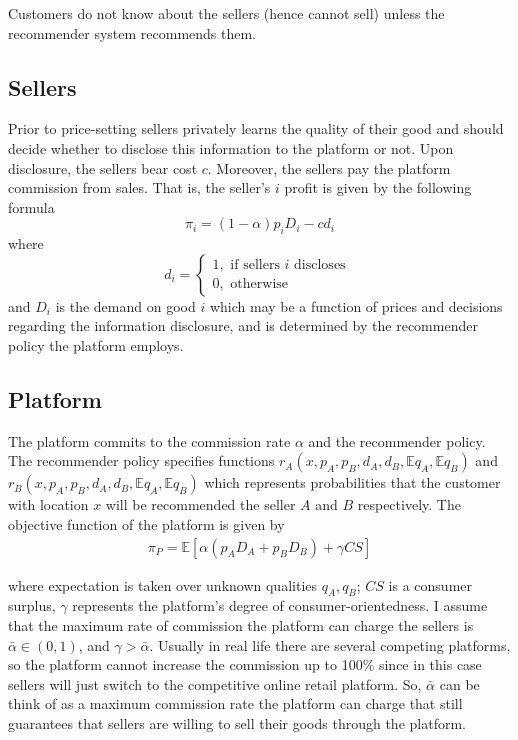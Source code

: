 \documentclass[a4paper]{article}
\begin{document}
Customers do not know about the sellers (hence cannot sell) unless the recommender system recommends them.

	
	
	\subsection{Sellers}
	
	
Prior to price-setting sellers privately learns the quality of their good and should decide whether to disclose this information to the platform or not. Upon disclosure, the sellers bear cost $c$. Moreover, the sellers pay the platform commission from sales. That is, the seller's $i$ profit is given by the following formula
$$\pi_i = (1-\alpha)p_i D_i - c d_i$$
where $$d_i = \begin{cases}
1, \text{ if sellers }i\text{ discloses }\\
0, \text{ otherwise }
\end{cases}$$ and $D_i$ is the demand on good $i$ which may be a function of prices and decisions regarding the information disclosure, and is determined by the recommender policy the platform employs.

	
	
	
	\subsection{Platform}
	
The platform commits to the commission rate $\alpha$ and the recommender policy. The recommender policy specifies functions $r_A(x, p_A, p_B, d_A, d_B, \mathbb{E}q_A, \mathbb{E}q_B)$ and $r_B(x, p_A, p_B, d_A, d_B, \mathbb{E} q_A, \mathbb{E} q_B)$ which represents probabilities that the customer with location $x$ will be recommended the seller $A$ and $B$ respectively. The objective function of the platform is given by \begin{align}\label{pl_profit}
\pi_P = \mathbb{E}\left[\alpha(p_A D_A + p_B D_B) + \gamma CS\right]
\end{align}

where expectation is taken over unknown qualities $q_A, q_B$; $CS$ is a consumer surplus, $\gamma$ represents the platform's degree of consumer-orientedness. I assume that the maximum rate of commission the platform can charge the sellers is $\bar{\alpha} \in (0, 1)$, and $\gamma > \bar{\alpha}$. Usually in real life there are several competing platforms, so the platform cannot increase the commission up to 100\% since in this case sellers will just switch to the competitive online retail platform. So, $\bar{\alpha}$ can be think of as a maximum commission rate the platform can charge that still guarantees that sellers are willing to sell their goods through the platform.
\end{document}

